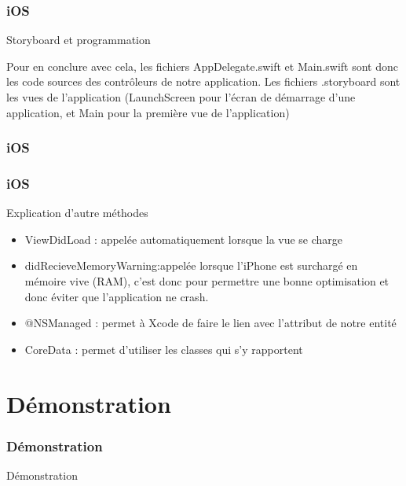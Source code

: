 \documentclass{beamer}
\begin{document}
\begin{frame}
	\frametitle{iOS}
	\begin{block}{Storyboard et programmation}
	\par Pour en conclure avec cela, les fichiers AppDelegate.swift et Main.swift sont donc les code sources des contrôleurs de notre application. Les fichiers .storyboard sont les vues de l’application (LaunchScreen pour l’écran de démarrage d’une application, et Main pour la première vue de l’application)
	\end{block}
\end{frame}


\begin{frame}
\frametitle{iOS}
	\frametitle{iOS}
	\begin{block}{Explication d'autre méthodes}
	 \begin{itemize}
	\item {ViewDidLoad :  appelée automatiquement lorsque la vue se charge } 
    	\item {didRecieveMemoryWarning:appelée lorsque l’iPhone est surchargé en mémoire vive (RAM), c’est donc pour permettre une bonne optimisation et donc éviter que l’application ne crash.}
\item {@NSManaged :  permet à Xcode de faire le lien avec l'attribut de notre entité } 
\item {CoreData :  permet d'utiliser les classes qui s'y rapportent } 
 	
  \end{itemize}
	\end{block}
\end{frame}


\section{Démonstration}

\begin{frame}
\frametitle{Démonstration}
	\Huge{\centerline{Démonstration}}
\end{frame}

\end{document}

